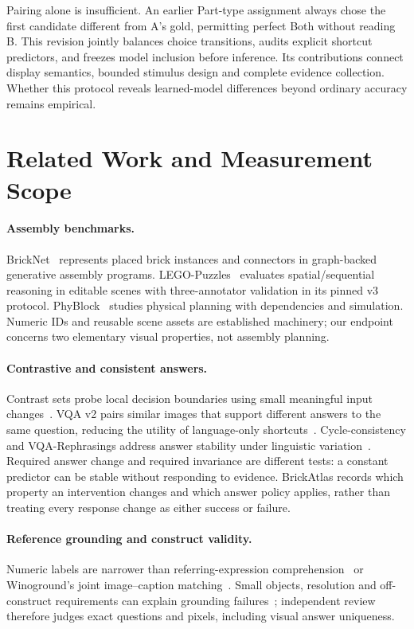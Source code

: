 \documentclass[10pt,twocolumn,letterpaper]{article}
\begin{document}
Pairing alone is insufficient. An earlier Part-type assignment always
chose the first candidate different from A's gold, permitting perfect
Both without reading B. This revision jointly balances choice transitions,
audits explicit shortcut predictors, and freezes model inclusion before
inference. Its contributions connect display semantics, bounded stimulus
design and complete evidence collection. Whether this protocol reveals
learned-model differences beyond ordinary accuracy remains empirical.

\section{Related Work and Measurement Scope}
\paragraph{Assembly benchmarks.}
BrickNet~\cite{kulits2026bricknet} represents placed brick instances and
connectors in graph-backed generative assembly programs.
LEGO-Puzzles~\cite{tang2025legopuzzles} evaluates spatial/sequential
reasoning in editable scenes with three-annotator validation in its
pinned v3 protocol. PhyBlock~\cite{ma2025phyblock} studies physical
planning with dependencies and simulation. Numeric IDs and reusable
scene assets are established machinery; our endpoint concerns two
elementary visual properties, not assembly planning.

\paragraph{Contrastive and consistent answers.}
Contrast sets probe local decision boundaries using small meaningful
input changes~\cite{gardner2020contrast}. VQA v2 pairs similar images
that support different answers to the same question, reducing the
utility of language-only shortcuts~\cite{goyal2017vqa}.
Cycle-consistency and VQA-Rephrasings address answer stability under
linguistic variation~\cite{shah2019cycle}. Required answer change and
required invariance are different tests: a constant predictor can be
stable without responding to evidence. BrickAtlas records which
property an intervention changes and which answer policy applies,
rather than treating every response change as either success or failure.

\paragraph{Reference grounding and construct validity.}
Numeric labels are narrower than referring-expression
comprehension~\cite{mao2016refexp} or Winoground's joint image--caption
matching~\cite{thrush2022winoground}. Small objects, resolution and
off-construct requirements can explain grounding
failures~\cite{diwan2022winoground}; independent review therefore judges
exact questions and pixels, including visual answer uniqueness.
\end{document}
